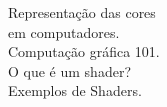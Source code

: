 \documentclass[preview]{standalone}
\begin{document}
Representação das cores \\ em computadores.\\Computação gráfica 101.\\O que é um shader?\\Exemplos de Shaders.\\
\end{document}
